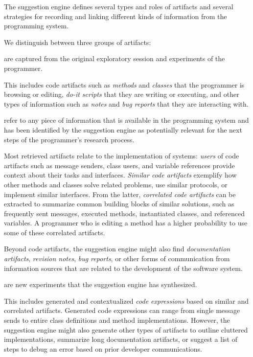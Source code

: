 The suggestion engine defines several types and roles of artifacts and several strategies for recording and linking different kinds of information from the programming system.

We distinguish between three groups of artifacts:

\begin{description}[noextralabelsep]
	\item[Input artifacts] are captured from the original exploratory session and experiments of the programmer.

	This includes code artifacts such as \emph{methods} and \emph{classes} that the programmer is browsing or editing, \emph{do-it scripts} that they are writing or executing, and other types of information such as \emph{notes} and \emph{bug reports} that they are interacting with.

	\item[Retrieved artifacts] refer to any piece of information that is available in the programming system and has been identified by the suggestion engine as potentially relevant for the next steps of the programmer's research process.

	Most retrieved artifacts relate to the implementation of systems: \emph{users} of code artifacts such as message senders, class users, and variable references provide context about their tasks and interfaces.
	\emph{Similar code artifacts} exemplify how other methods and classes solve related problems, use similar protocols, or implement similar interfaces.
	From the latter, \emph{correlated code artifacts} can be extracted to summarize common building blocks of similar solutions, such as frequently sent messages, executed methods, instantiated classes, and referenced variables.
	A programmer who is editing a method has a higher probability to use some of these correlated artifacts.

	Beyond code artifacts, the suggestion engine might also find \emph{documentation artifacts}, \emph{revision notes}, \emph{bug reports}, or other forms of communication from information sources that are related to the development of the software system.

	\item[Generated artifacts] are new experiments that the suggestion engine has synthesized.

	This includes generated and contextualized \emph{code expressions} based on similar and correlated artifacts.
	Generated code expressions can range from single message sends to entire class definitions and method implementations.
	However, the suggestion engine might also generate other types of artifacts to outline cluttered implementations, summarize long documentation artifacts, or suggest a list of steps to debug an error based on prior developer communications.
\end{description}

